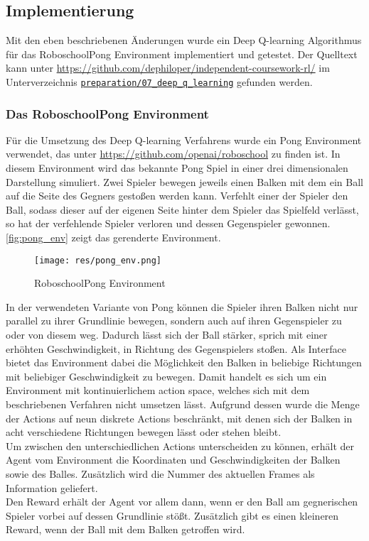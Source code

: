 \documentclass[11pt]{scrartcl}
\begin{document}
\subsection{Implementierung}
Mit den eben beschriebenen Änderungen wurde ein Deep Q-learning Algorithmus für das
RoboschoolPong Environment implementiert und getestet. Der Quelltext kann unter
\url{https://github.com/dephiloper/independent-coursework-rl/} im Unterverzeichnis
\href{https://github.com/dephiloper/independent-coursework-rl/tree/master/preparation/07_deep_q_learning}
{\nolinkurl{preparation/07\_deep\_q\_learning}} gefunden werden.


\subsubsection{Das RoboschoolPong Environment}
Für die Umsetzung des Deep Q-learning Verfahrens wurde ein Pong Environment verwendet, das
unter \url{https://github.com/openai/roboschool} zu finden ist. In diesem Environment wird
das bekannte Pong Spiel in einer drei dimensionalen Darstellung simuliert. Zwei Spieler
bewegen jeweils einen Balken mit dem ein Ball auf die Seite des Gegners gestoßen werden
kann. Verfehlt einer der Spieler den Ball, sodass dieser auf der eigenen Seite hinter dem
Spieler das Spielfeld verlässt, so hat der verfehlende Spieler verloren und dessen
Gegenspieler gewonnen. \autoref{fig:pong_env} zeigt das gerenderte Environment.

\begin{figure}[htp]
\centering
\texttt{[image: res/pong\_env.png]}
\caption{RoboschoolPong Environment}
\label{fig:pong_env}
\end{figure}
\noindent
In der verwendeten Variante von Pong können die Spieler ihren Balken nicht nur parallel zu
ihrer Grundlinie bewegen, sondern auch auf ihren Gegenspieler zu oder von diesem weg.
Dadurch lässt sich der Ball stärker, sprich mit einer erhöhten Geschwindigkeit, in Richtung
des Gegenspielers stoßen. Als Interface bietet das Environment dabei die Möglichkeit den
Balken in beliebige Richtungen mit beliebiger Geschwindigkeit zu bewegen. Damit handelt es
sich um ein Environment mit kontinuierlichem action space, welches sich mit dem
beschriebenen Verfahren nicht umsetzen lässt. Aufgrund dessen wurde die Menge der Actions auf
neun diskrete Actions beschränkt, mit denen sich der Balken in acht verschiedene Richtungen
bewegen lässt oder stehen bleibt.\\
Um zwischen den unterschiedlichen Actions unterscheiden zu können, erhält der Agent vom
Environment die Koordinaten und Geschwindigkeiten der Balken sowie des Balles. Zusätzlich
wird die Nummer des aktuellen Frames als Information geliefert.\\
Den Reward erhält der Agent vor allem dann, wenn er den Ball am gegnerischen Spieler vorbei
auf dessen Grundlinie stößt. Zusätzlich gibt es einen kleineren Reward, wenn der Ball mit
dem Balken getroffen wird.
\end{document}
